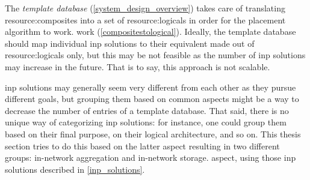 The \textit{template database}
\ifdefined\THESISSUMMARY \else
(\autoref{system_design_overview})
\fi
takes care of translating \glspl{resource:composite} into a set of \glspl{resource:logical} in order for the placement algorithm to
\ifdefined\THESISSUMMARY
work.
\else
work (\autoref{compositestological}).
\fi
Ideally, the template database should map individual \gls{inp} solutions to their equivalent made out of \glspl{resource:logical} only, but this may be not feasible as the number of \gls{inp} solutions may increase in the future.
That is to say, this approach is not scalable.
\ifdefined\THESISSUMMARY \else

\fi
\gls{inp} solutions may generally seem very different from each other as they pursue different goals, but grouping them based on common aspects might be a way to decrease the number of entries of a template database. %
That said, there is no unique way of categorizing \gls{inp} solutions: for instance, one could group them based on their final purpose, on their logical architecture, and so on.
This
\ifdefined\THESISSUMMARY
thesis
\else
section
\fi
tries to do this based on the latter
\ifdefined\THESISSUMMARY
aspect resulting in two different groups: in-network aggregation and in-network storage.
\else
aspect, using those \gls{inp} solutions described in \autoref{inp_solutions}.\fi
